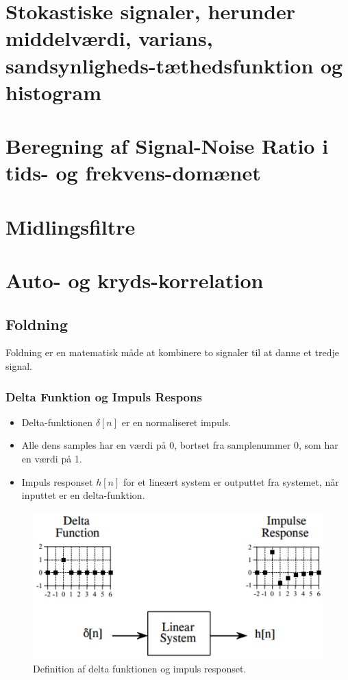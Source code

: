 \documentclass[danish]{article}
\begin{document}
\newpage
\section{Stokastiske signaler, herunder middelværdi, varians, sandsynligheds-tæthedsfunktion og histogram}
\newpage
\section{Beregning af Signal-Noise Ratio i tids- og frekvens-domænet}
\newpage
\section{Midlingsfiltre}

\newpage
\section{Auto- og kryds-korrelation}
\subsection{Foldning}
Foldning er en matematisk måde at kombinere to signaler til at danne et tredje signal.
\subsubsection{Delta Funktion og Impuls Respons}
\begin{itemize}
	\item Delta-funktionen $\delta[n]$ er en normaliseret impuls.
	\item Alle dens samples har en værdi på 0, bortset fra samplenummer 0, som har en værdi på 1.
	\item Impuls responset $h[n]$ for et lineært system er outputtet fra systemet, når inputtet er en delta-funktion.
\end{itemize}

\begin{figure} [H]
	\centering
	\includegraphics[width=0.6\linewidth]{graphics/deltafunction_impulseresponse}
	\caption{Definition af delta funktionen og impuls responset.}
	\label{fig:deltafunction_impulseresponse}
\end{figure}
\end{document}
